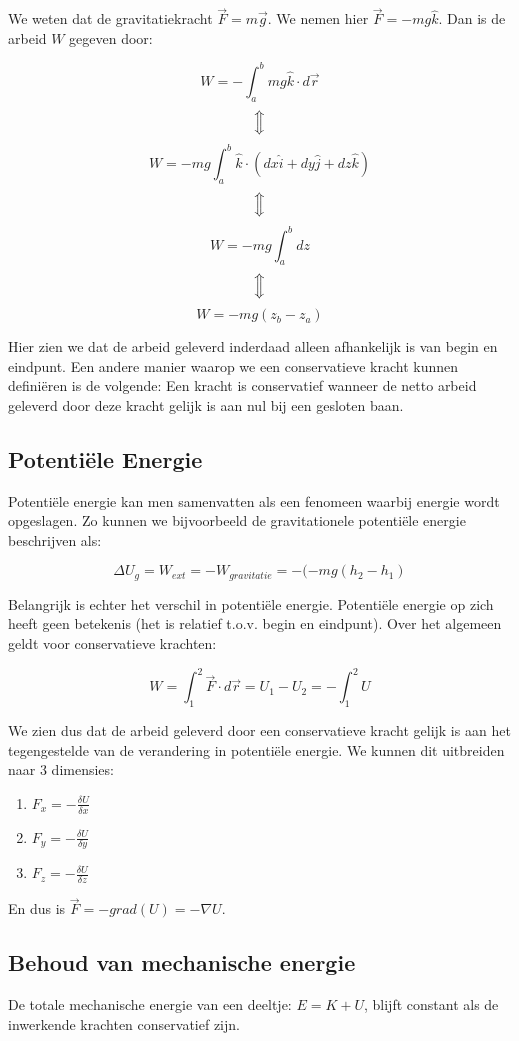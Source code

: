 \documentclass[12pt,a4paper]{article}
\newcommand{\Luda}{\Big\Updownarrow}
\begin{document}
    We weten dat de gravitatiekracht $\vec{F} = m\vec{g}$. We nemen hier $\vec{F} = -mg\hat{k}$. 
    Dan is de arbeid $W$ gegeven door:
    
    $$W = -\int_{a}^{b}mg\hat{k} \cdot d\vec{r}$$
    $$\Luda$$
    $$W = -mg\int_{a}^{b}\hat{k}\cdot (dx\hat{i} + dy\hat{j} + dz\hat{k})$$
    $$\Luda$$
    $$W = -mg\int_{a}^{b}dz$$
    $$\Luda$$
    $$W = -mg(z_b - z_a)$$

    Hier zien we dat de arbeid geleverd inderdaad alleen afhankelijk is van begin en eindpunt. Een andere manier waarop
    we een conservatieve kracht kunnen definiëren is de volgende: Een kracht is conservatief wanneer de netto arbeid geleverd
    door deze kracht gelijk is aan nul bij een gesloten baan. 
    
    \subsection{Potentiële Energie}
    Potentiële energie kan men samenvatten als een fenomeen waarbij energie wordt opgeslagen. Zo kunnen we bijvoorbeeld
    de gravitationele potentiële energie beschrijven als:
    
    $$\Delta U_g = W_{ext} = -W_{gravitatie} = -(-mg(h_2 - h_1)$$
    
    Belangrijk is echter het verschil in potentiële energie. Potentiële energie op zich heeft geen betekenis (het is relatief t.o.v.
    begin en eindpunt). Over het algemeen geldt voor conservatieve krachten:
    
    $$W = \int_{1}^{2}\vec{F}\cdot d\vec{r} = U_1 - U_2 = -\int_{1}^{2} U$$
    
    We zien dus dat de arbeid geleverd door een conservatieve kracht gelijk is aan het tegengestelde van de verandering in potentiële energie. We kunnen
    dit uitbreiden naar 3 dimensies:
    
    \begin{enumerate}
    	\item $F_x = -\frac{\delta U}{\delta x}$
    	\item $F_y = -\frac{\delta U}{\delta y}$
    	\item $F_z = -\frac{\delta U}{\delta z}$
    \end{enumerate}
    
    En dus is $\vec{F} = -grad(U) = -\mathbb{\nabla}{U}$.

    \subsection{Behoud van mechanische energie}
    De totale mechanische energie van een deeltje: $E = K + U$,
    blijft constant als de inwerkende krachten conservatief zijn.
    
\end{document}
